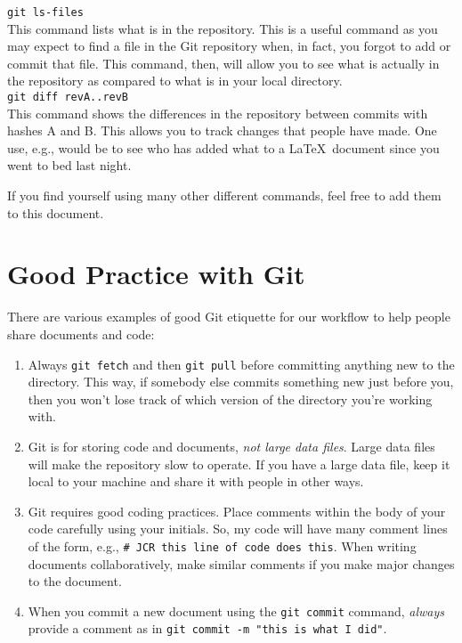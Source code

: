 \documentclass[12pt, letterpaper]{article}
\newcommand{\code}{\texttt}
\begin{document}
\noindent \code{git ls-files} \\
This command lists what is in the repository. This is a useful command as you may expect to find a file in the Git repository when, in fact, you forgot to add or commit that file. This command, then, will allow you to see what is actually in the repository as compared to what is in your local directory. \\

\noindent \code{git diff revA..revB} \\
This command shows the differences in the repository between commits with hashes A and B.  This allows you to track changes that people have made.  One use, e.g., would be to see who has added what to a \LaTeX\ document since you went to bed last night.

If you find yourself using many other different commands, feel free to add them to this document.

\hypertarget{refbkmk7}{}
\section*{Good Practice with Git}

There are various examples of good Git etiquette for our workflow to help people share documents and code:

\begin{enumerate}
\item Always \code{git fetch} and then \code{git pull} before committing anything new to the directory.  This way, if somebody else commits something new just before you, then you won't lose track of which version of the directory you're working with.
\item Git is for storing code and documents, {\it not large data files}.  Large data files will make the repository slow to operate.  If you have a large data file, keep it local to your machine and share it with people in other ways.
\item Git requires good coding practices.  Place comments within the body of your code carefully using your initials.  So, my code will have many comment lines of the form, e.g., \code{\# JCR this line of code does this}.  When writing documents collaboratively, make similar comments if you make major changes to the document.
\item When you commit a new document using the \code{git commit} command, {\it always} provide a comment as in \code{git commit -m "this is what I did"}.
\end{enumerate}
\end{document}
